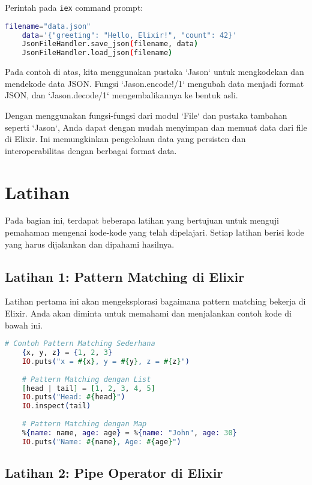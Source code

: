 Perintah pada \texttt{iex} command prompt: 

\begin{lstlisting}[language=bash]
	filename="data.json"
	data='{"greeting": "Hello, Elixir!", "count": 42}'
	JsonFileHandler.save_json(filename, data)
	JsonFileHandler.load_json(filename)
\end{lstlisting}

Pada contoh di atas, kita menggunakan pustaka `Jason` untuk mengkodekan dan mendekode data JSON. Fungsi `Jason.encode!/1` mengubah data menjadi format JSON, dan `Jason.decode/1` mengembalikannya ke bentuk asli.

Dengan menggunakan fungsi-fungsi dari modul `File` dan pustaka tambahan seperti `Jason`, Anda dapat dengan mudah menyimpan dan memuat data dari file di Elixir. Ini memungkinkan pengelolaan data yang persisten dan interoperabilitas dengan berbagai format data.


\section{Latihan}

Pada bagian ini, terdapat beberapa latihan yang bertujuan untuk menguji pemahaman mengenai kode-kode yang telah dipelajari. Setiap latihan berisi kode yang harus dijalankan dan dipahami hasilnya.

\subsection{Latihan 1: Pattern Matching di Elixir}

Latihan pertama ini akan mengeksplorasi bagaimana pattern matching bekerja di Elixir. Anda akan diminta untuk memahami dan menjalankan contoh kode di bawah ini.

\begin{lstlisting}[language=Elixir]
	# Contoh Pattern Matching Sederhana
	{x, y, z} = {1, 2, 3}
	IO.puts("x = #{x}, y = #{y}, z = #{z}")
	
	# Pattern Matching dengan List
	[head | tail] = [1, 2, 3, 4, 5]
	IO.puts("Head: #{head}")
	IO.inspect(tail)
	
	# Pattern Matching dengan Map
	%{name: name, age: age} = %{name: "John", age: 30}
	IO.puts("Name: #{name}, Age: #{age}")
\end{lstlisting}

\subsection{Latihan 2: Pipe Operator di Elixir}

